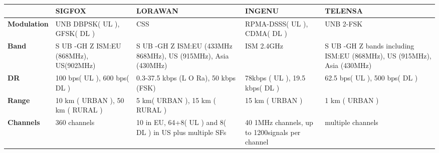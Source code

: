 \begin{table}[h!]
\scriptsize
	\begin{tabulary}{\columnwidth}{L|L|L|L|L}
	\                                            & \textbf{SIGFOX}                               & \textbf{LORAWAN}                                              & \textbf{INGENU}                                 & \textbf{TELENSA} \\\hline                                                              
	\textbf{Modulation}                          & UNB DBPSK( UL ), GFSK( DL )                   & CSS                                                           & RPMA-DSSS( UL ), CDMA( DL )                     & UNB 2-FSK \\\hline                                                             
	\textbf{Band}                                & S UB -GH Z ISM:EU (868MHz), US(902MHz)        & S UB -GH Z ISM:EU (433MHz 868MHz), US (915MHz), Asia (430MHz) & ISM 2.4GHz                                      & S UB -GH Z bands including ISM:EU (868MHz), US (915MHz), Asia (430MHz) \\\hline
	\textbf{\ac{DR}}                             & 100 bps( UL ), 600 bps( DL )                  & 0.3-37.5 kbps (L O Ra), 50 kbps (FSK)                         & 78kbps ( UL ), 19.5 kbps( DL )                  & 62.5 bps( UL ), 500 bps( DL ) \\\hline                                         
	\textbf{Range}                               & 10 km ( URBAN ), 50 km ( RURAL )              & 5 km( URBAN ), 15 km ( RURAL )                                & 15 km ( URBAN )                                 & 1 km ( URBAN ) \\\hline                                                        
	\textbf{Channels}                            & 360 channels                                  & 10 in EU, 64+8( UL ) and 8( DL ) in US plus multiple SFs      & 40 1MHz channels, up to 1200signals per channel & multiple channels \\\hline                                                     
	\end{tabulary}
\caption{\label{tab:edesf} \cite{raza_low_22}}
\end{table}


